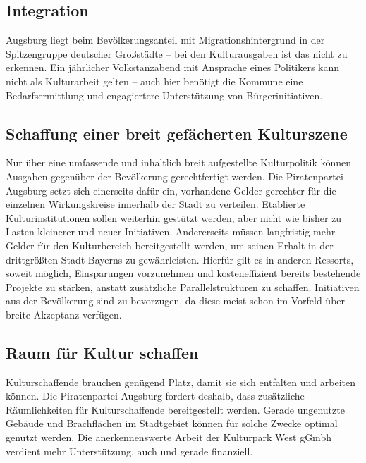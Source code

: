 \documentclass[a5paper, ngerman, 10pt]{scrbook}
\begin{document}
   \subsection{Integration}
   
   Augsburg liegt beim Bevölkerungsanteil mit Migrationshintergrund in der 
   Spitzengruppe deutscher Großstädte – bei den Kulturausgaben ist das nicht 
   zu erkennen. Ein jährlicher Volkstanzabend mit Ansprache eines Politikers 
   kann nicht als Kulturarbeit gelten – auch hier benötigt die Kommune eine 
   Bedarfsermittlung und engagiertere Unterstützung von Bürgerinitiativen.
   
   \subsection{Schaffung einer breit gefächerten Kulturszene}
   
   Nur über eine umfassende und inhaltlich breit aufgestellte Kulturpolitik 
   können Ausgaben gegenüber der Bevölkerung gerechtfertigt werden. Die 
   Piratenpartei Augsburg setzt sich einerseits dafür ein, vorhandene Gelder 
   gerechter für die einzelnen Wirkungskreise innerhalb der Stadt zu 
   verteilen. Etablierte Kulturinstitutionen sollen weiterhin gestützt werden, 
   aber nicht wie bisher zu Lasten kleinerer und neuer Initiativen. 
   Andererseits müssen langfristig mehr Gelder für den Kulturbereich 
   bereitgestellt werden, um seinen Erhalt in der drittgrößten Stadt Bayerns 
   zu gewährleisten. Hierfür gilt es in anderen Ressorts, soweit möglich, 
   Einsparungen vorzunehmen und kosteneffizient bereits bestehende Projekte zu 
   stärken, anstatt zusätzliche Parallelstrukturen zu schaffen. Initiativen 
   aus der Bevölkerung sind zu bevorzugen, da diese meist schon im Vorfeld 
   über breite Akzeptanz verfügen.
   
   \subsection{Raum für Kultur schaffen}
   
   Kulturschaffende brauchen genügend Platz, damit sie sich entfalten und 
   arbeiten können. Die Piratenpartei Augsburg fordert deshalb, dass 
   zusätzliche Räumlichkeiten für Kulturschaffende bereitgestellt werden. 
   Gerade ungenutzte Gebäude und Brachflächen im Stadtgebiet können für solche 
   Zwecke optimal genutzt werden. Die anerkennenswerte Arbeit der Kulturpark 
   West gGmbh verdient mehr Unterstützung, auch und gerade finanziell.
   
\end{document}
